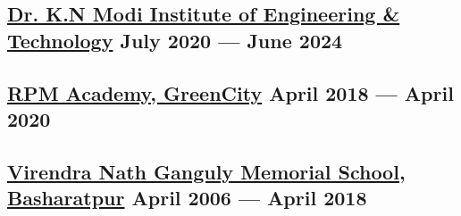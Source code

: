 





\subsection{{\href{https://www.knmiet.edu/}{Dr. K.N Modi Institute of Engineering & Technology} \hfill July 2020 --- June 2024}}

\vspace{0.25em}

\vspace{0.2em}
\begin{null}
\end{null}

\subsection{{\href{https://rpmacademy.org/}{RPM Academy, GreenCity} \hfill April 2018 --- April 2020}}
\begin{null}

\end{null}

\subsection{{\href{https://www.vngms.com/}{Virendra Nath Ganguly Memorial School, Basharatpur} \hfill April 2006 --- April 2018}}
\begin{null}

\end{null}